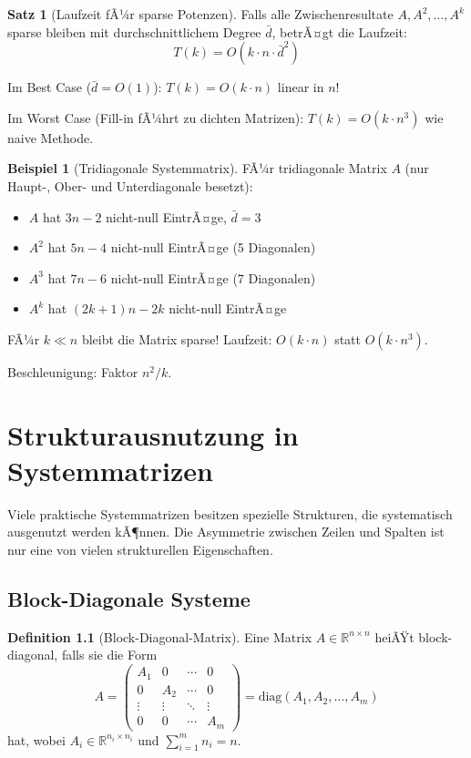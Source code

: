 ﻿\documentclass[a4paper,12pt]{report}
\theoremstyle{definition}
\newtheorem{definition}{Definition}
\newtheorem{beispiel}{Beispiel}
\newtheorem{satz}{Satz}
\begin{document}
	\begin{satz}[Laufzeit fÃ¼r sparse Potenzen]
		Falls alle Zwischenresultate $A, A^2, \ldots, A^k$ sparse bleiben mit durchschnittlichem Degree $\bar{d}$, betrÃ¤gt die Laufzeit:
		\[
		T(k) = O(k \cdot n \cdot \bar{d}^2)
		\]
		
		Im Best Case ($\bar{d} = O(1)$): $T(k) = O(k \cdot n)$ linear in $n$!
		
		Im Worst Case (Fill-in fÃ¼hrt zu dichten Matrizen): $T(k) = O(k \cdot n^3)$ wie naive Methode.
	\end{satz}
	
	\begin{beispiel}[Tridiagonale Systemmatrix]
		FÃ¼r tridiagonale Matrix $A$ (nur Haupt-, Ober- und Unterdiagonale besetzt):
		\begin{itemize}
			\item $A$ hat $3n - 2$ nicht-null EintrÃ¤ge, $\bar{d} = 3$
			\item $A^2$ hat $5n - 4$ nicht-null EintrÃ¤ge (5 Diagonalen)
			\item $A^3$ hat $7n - 6$ nicht-null EintrÃ¤ge (7 Diagonalen)
			\item $A^k$ hat $(2k+1)n - 2k$ nicht-null EintrÃ¤ge
		\end{itemize}
		
		FÃ¼r $k \ll n$ bleibt die Matrix sparse! Laufzeit: $O(k \cdot n)$ statt $O(k \cdot n^3)$.
		
		Beschleunigung: Faktor $n^2 / k$.
	\end{beispiel}
	
	\chapter{Strukturausnutzung in Systemmatrizen}
	
	Viele praktische Systemmatrizen besitzen spezielle Strukturen, die systematisch ausgenutzt werden kÃ¶nnen. Die Asymmetrie zwischen Zeilen und Spalten ist nur eine von vielen strukturellen Eigenschaften.
	
	\section{Block-Diagonale Systeme}
	
	\begin{definition}[Block-Diagonal-Matrix]
		Eine Matrix $A \in \mathbb{R}^{n \times n}$ heiÃŸt block-diagonal, falls sie die Form
		\[
		A = \begin{pmatrix}
			A_1 & 0 & \cdots & 0 \\
			0 & A_2 & \cdots & 0 \\
			\vdots & \vdots & \ddots & \vdots \\
			0 & 0 & \cdots & A_m
		\end{pmatrix} = \text{diag}(A_1, A_2, \ldots, A_m)
		\]
		hat, wobei $A_i \in \mathbb{R}^{n_i \times n_i}$ und $\sum_{i=1}^m n_i = n$.
	\end{definition}
	
\end{document}
